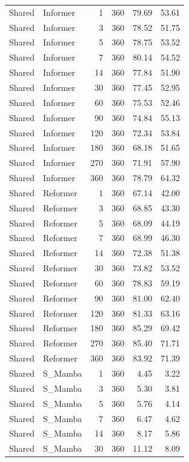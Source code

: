 {\begin{longtable}{llrrrr}
Shared & Informer & 1 & 360 & 79.69 & 53.61 \\
Shared & Informer & 3 & 360 & 78.52 & 51.75 \\
Shared & Informer & 5 & 360 & 78.75 & 53.52 \\
Shared & Informer & 7 & 360 & 80.14 & 54.52 \\
Shared & Informer & 14 & 360 & 77.84 & 51.90 \\
Shared & Informer & 30 & 360 & 77.45 & 52.95 \\
Shared & Informer & 60 & 360 & 75.53 & 52.46 \\
Shared & Informer & 90 & 360 & 74.84 & 55.13 \\
Shared & Informer & 120 & 360 & 72.34 & 53.84 \\
Shared & Informer & 180 & 360 & 68.18 & 51.65 \\
Shared & Informer & 270 & 360 & 71.91 & 57.90 \\
Shared & Informer & 360 & 360 & 78.79 & 64.32 \\
Shared & Reformer & 1 & 360 & 67.14 & 42.00 \\
Shared & Reformer & 3 & 360 & 68.85 & 43.30 \\
Shared & Reformer & 5 & 360 & 68.09 & 44.19 \\
Shared & Reformer & 7 & 360 & 68.99 & 46.30 \\
Shared & Reformer & 14 & 360 & 72.38 & 51.38 \\
Shared & Reformer & 30 & 360 & 73.82 & 53.52 \\
Shared & Reformer & 60 & 360 & 78.83 & 59.19 \\
Shared & Reformer & 90 & 360 & 81.00 & 62.40 \\
Shared & Reformer & 120 & 360 & 81.33 & 63.16 \\
Shared & Reformer & 180 & 360 & 85.29 & 69.42 \\
Shared & Reformer & 270 & 360 & 85.40 & 71.71 \\
Shared & Reformer & 360 & 360 & 83.92 & 71.39 \\
Shared & S\_Mamba & 1 & 360 & 4.45 & 3.22 \\
Shared & S\_Mamba & 3 & 360 & 5.30 & 3.81 \\
Shared & S\_Mamba & 5 & 360 & 5.76 & 4.14 \\
Shared & S\_Mamba & 7 & 360 & 6.47 & 4.62 \\
Shared & S\_Mamba & 14 & 360 & 8.17 & 5.86 \\
Shared & S\_Mamba & 30 & 360 & 11.12 & 8.09 \\

\end{longtable}}
